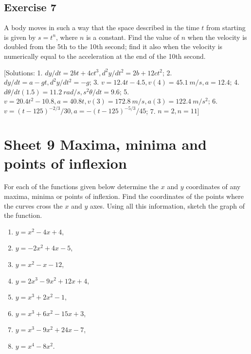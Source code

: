 \documentclass[
  11pt,
  oneside]{book}
\providecommand{\tightlist}{%
  \setlength{\itemsep}{0pt}\setlength{\parskip}{0pt}}
\newcommand{\slide}{}
\theoremstyle{definition}
\theoremstyle{definition}
\theoremstyle{definition}
\theoremstyle{definition}
\theoremstyle{remark}
\begin{document}
\slide

\subsection*{Exercise 7}\label{exercise-7}

A body moves in such a way that the space described in the time \(t\) from starting is given by \(s = t^n\), where \(n\) is a constant. Find the value of \(n\) when the velocity is doubled from the 5th to the 10th second; find it also when the velocity is numerically equal to the acceleration at the end of the 10th second.

{[}Solutions: 1. \(dy/dt=2bt+4ct^3, d^2y/dt^2=2b+12ct^2\); 2. \(dy/dt=a-gt, d^2y/dt^2=-g\); 3. \(v=12.4t-4.5, v(4)=45.1\ m/s, a=12.4\); 4. \(d\theta/dt(1.5)=11.2\ rad/s, s^2\theta/dt = 9.6\); 5. \(v=20.4t^2-10.8, a=40.8t, v(3)=172.8\ m/s, a(3)=122.4\ m/s^2\); 6. \(v=(t-125)^{-2/3}/30, a=-(t-125)^{-5/3}/45\); 7. \(n=2, n=11\){]}

\slide

\section{Sheet 9 Maxima, minima and points of inflexion}\label{sheet-9-maxima-minima-and-points-of-inflexion}

For each of the functions given below determine the \(x\) and \(y\) coordinates of any maxima, minima or points of inflexion. Find the coordinates of the points where the curves cross the \(x\) and \(y\) axes. Using all this information, sketch the graph of the function.

\begin{enumerate}
\def\labelenumi{\arabic{enumi}.}
\tightlist
\item
  \(y=x^2-4x+4\),
\item
  \(y=-2x^2+4x-5\),
\item
  \(y=x^2-x-12\),
\item
  \(y=2x^3-9x^2+12x+4\),
\item
  \(y=x^3+2x^2-1\),
\item
  \(y=x^3+6x^2-15x+3\),
\item
  \(y=x^3-9x^2+24x-7\),
\item
  \(y=x^4-8x^2\).
\end{enumerate}
\end{document}
